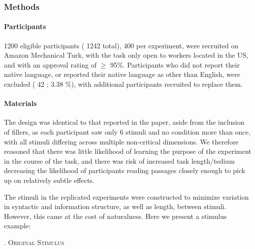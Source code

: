 \documentclass{sp}\usepackage[]{graphicx}\usepackage[]{color}
\begin{document}
\subsubsection{Methods}

\paragraph*{Participants}

1200 eligible participants (%
1242
 total), 400 per experiment, were recruited on Amazon Mechanical Turk, with the task only open to workers located in the US, and with an approval rating of $\geq$ 95\%. Participants who did not report their native language, or reported their native language as other than English, were excluded (%
42%
; %
3.38%
\%), with additional participants recruited to replace them.

\paragraph*{Materials}

The design was identical to that reported in the paper, aside from the inclusion of fillers, as each participant saw only 6 stimuli and no condition more than once, with all stimuli differing across multiple non-critical dimensions.  We therefore reasoned that there was little likelihood of learning the purpose of the experiment in the course of the task, and there was risk of increased task length/tedium decreasing the likelihood of participants reading passages closely enough to pick up on relatively subtle effects.

The stimuli in the replicated experiments were constructed to minimize variation in syntactic and information structure, as well as length, between stimuli.  However, this came at the cost of naturalness.  Here we present a stimulus example:


\ex.{\label{ex:oldstimulus}} \centering\textsc{Original Stimulus}
\end{document}
